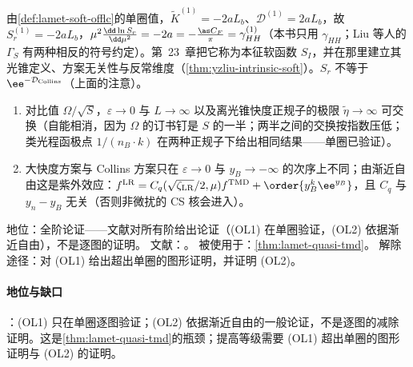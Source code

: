 由\cref{def:lamet-soft-offlc}的单圈值，$\tilde K^{(1)}=-2aL_b$、$\mathcal D^{(1)}=2aL_b$，故 $S_r^{(1)}=-2aL_b$，$\mu^2\frac{\dd\ln S_r}{\dd\mu^2}=-2a=-\frac{\as C_F}\pi=\gamma^{(1)}_{HH}$（本书只用 $\gamma_{HH}$；Liu 等人的 $\Gamma_S$ 有两种相反的符号约定）。第~23~章把它称为本征软函数 $S_I$，并在那里建立其光锥定义、方案无关性与反常维度（\cref{thm:yzliu-intrinsic-soft}）。$S_r$ 不等于 $\ee^{-\mathcal D_{\rm Collins}}$（上面的注意）。

\begin{assumption}\label{asm:lamet-order-limits}
\begin{enumerate}[label=(OL\arabic*),leftmargin=3.2em,itemsep=1pt,topsep=2pt]
\item 对比值 $\Omega/\sqrt S$，$\varepsilon\to0$ 与 $L\to\infty$ 以及离光锥快度正规子的极限 $\tilde\eta\to\infty$ 可交换（自能相消，因为 $\Omega$ 的订书钉是 $S$ 的一半；两半之间的交换按指数压低；类光程函极点 $1/(n_B\cdot k)$ 在两种正规子下给出相同结果——单圈已验证）。
\item 大快度方案与 Collins 方案只在 $\varepsilon\to0$ 与 $y_B\to-\infty$ 的次序上不同；由渐近自由这是紫外效应：$f^{\rm LR}=C_q(\sqrt{\zeta_{\rm LR}}/2,\mu)f^{\rm TMD}+\order{y_B^k\ee^{y_B}}$，且 $C_q$ 与 $y_n-y_B$ 无关（否则非微扰的 CS 核会进入）。
\end{enumerate}
地位：全阶论证——文献\cite{Ebert:2022fmh}对所有阶给出论证（(OL1) 在单圈验证，(OL2) 依据渐近自由），不是逐图的证明。
文献：\cite{Ebert:2022fmh}。
被使用于：\cref{thm:lamet-quasi-tmd}。
解除途径：对 (OL1) 给出超出单圈的图形证明，并证明 (OL2)。
\end{assumption}

\paragraph{地位与缺口}
\tagA：(OL1) 只在单圈逐图验证；(OL2) 依据渐近自由的一般论证，不是逐图的减除证明\cite{Ebert:2022fmh}。这是\cref{thm:lamet-quasi-tmd}的瓶颈；提高等级需要 (OL1) 超出单圈的图形证明与 (OL2) 的证明。

